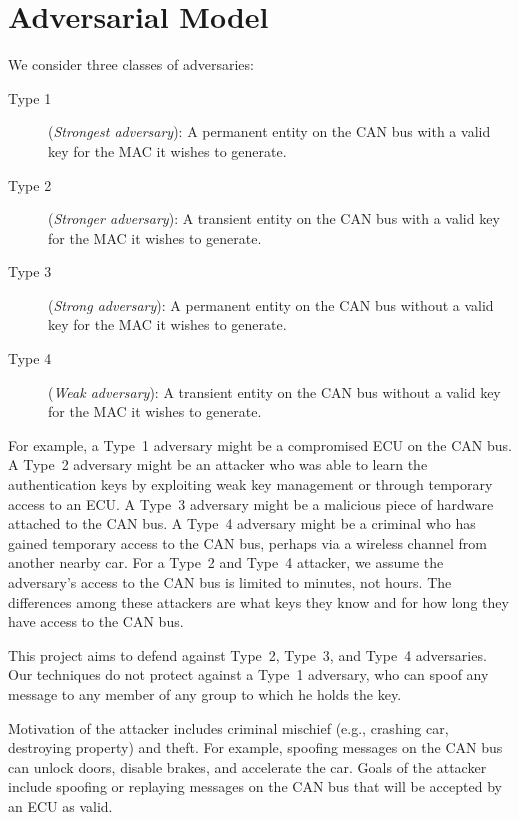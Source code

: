 \section{Adversarial Model}
\label{adversary}

We consider three classes of adversaries:

\begin{description}

	\item [Type 1]
	(\textit{Strongest adversary}): A permanent entity on the CAN bus with a valid key for the MAC it wishes to generate.
	
	\item [Type 2]
	(\textit{Stronger adversary}): A transient entity on the CAN bus with a valid key for the MAC it wishes to generate.
	
	\item [Type 3]
	(\textit{Strong adversary}): A permanent entity on the CAN bus without a valid key for the MAC it wishes to generate.
	
	\item [Type 4]
	(\textit{Weak adversary}): A transient entity on the CAN bus without a valid key for the MAC it wishes to generate.
	
\end{description}

For example, a Type~1 adversary might be a compromised ECU on the CAN bus.  
A Type~2 adversary might be an attacker who was able to learn the authentication keys by
exploiting weak key management or through temporary access to an ECU.
A Type~3 adversary might be a malicious piece of hardware attached
to the CAN bus.  
A Type~4 adversary might be a criminal who has gained temporary access to the CAN bus, perhaps via a wireless channel from
another nearby car.  For a Type~2 and Type~4 attacker, we assume the adversary's access to the CAN bus is limited to minutes, not hours.  
The differences among these attackers are what keys they know and for how long they have access to the CAN bus.

This project aims to defend against Type~2, Type~3, and Type~4 adversaries.   Our techniques do not protect against 
a Type~1 adversary, who can spoof any message to any member of any group to which he holds the key. 

Motivation of the attacker includes criminal mischief (e.g., crashing car, destroying property) and theft.  
For example, spoofing messages on the CAN bus can unlock doors, disable brakes, and accelerate the car.
Goals of the attacker include spoofing or replaying messages on the CAN bus that will be accepted by an ECU
as valid.


